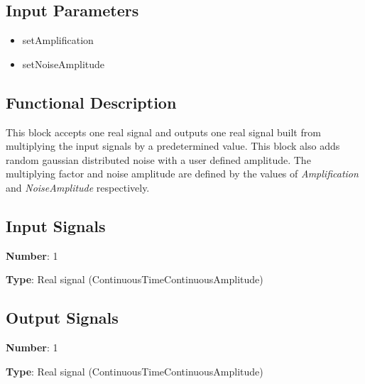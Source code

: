 \documentclass[../../sdf/tex/BPSK_system.tex]{subfiles}
\date{ }
\begin{document}
\onlyinsubfile{\maketitle}

\subsection*{Input Parameters}

\begin{multicols}{2}
	\begin{itemize}
		\item setAmplification
		\item setNoiseAmplitude
	\end{itemize}
\end{multicols}

\subsection*{Functional Description}

This block accepts one real signal and outputs one real signal built from multiplying the input signals by a predetermined value. This block also adds random gaussian distributed noise with a user defined amplitude. The multiplying factor and noise amplitude are defined by the values of \textit{Amplification} and \textit{NoiseAmplitude} respectively.

\subsection*{Input Signals}

\textbf{Number}: 1

\textbf{Type}: Real signal (ContinuousTimeContinuousAmplitude)

\subsection*{Output Signals}

\textbf{Number}: 1

\textbf{Type}: Real signal (ContinuousTimeContinuousAmplitude)
\end{document}
